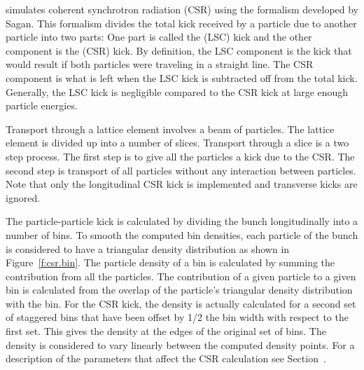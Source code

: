 \bmad simulates coherent synchrotron radiation (CSR) using the
formalism developed by Sagan\cite{b:csr}.  This formalism divides the
total kick received by a particle due to another particle into two
parts: One part is called the  (LSC)
kick and the other component is the  (CSR) kick. By definition, the LSC component is the
kick that would result if both particles were traveling in a straight
line. The CSR component is what is left when the LSC kick is
subtracted off from the total kick. Generally, the LSC kick is
negligible compared to the CSR kick at large enough particle energies.

Transport through a lattice element involves a beam of particles. The
lattice element is divided up into a number of slices. Transport
through a slice is a two step process.  The first step is to give all
the particles a kick due to the CSR. The second step is transport of
all particles without any interaction between particles. Note that
only the longitudinal CSR kick is implemented and transverse kicks are
ignored.

The particle-particle kick is calculated by dividing the bunch
longitudinally into a number of bins. To smooth the computed bin
densities, each particle of the bunch is considered to have a
triangular density distribution as shown in Figure~\ref{f:csr.bin}.
The particle density of a bin is calculated by summing the
contribution from all the particles. The contribution of a given
particle to a given bin is calculated from the overlap of the
particle's triangular density distribution with the bin. For the CSR
kick, the density is actually calculated for a second set of staggered
bins that have been offset by 1/2 the bin width with respect to the
first set. This gives the density at the edges of the original set of
bins. The density is considered to vary linearly between the computed
density points. For a description of the parameters that affect the
CSR calculation see Section~.
 